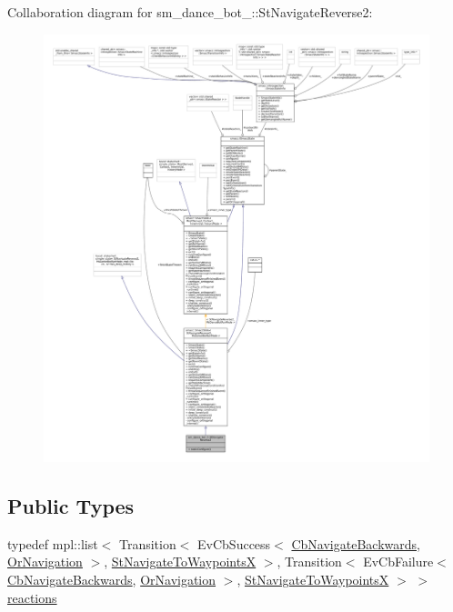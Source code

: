 Collaboration diagram for sm\+\_\+dance\+\_\+bot\+\_\+:\+:St\+Navigate\+Reverse2\+:
\nopagebreak
\begin{figure}[H]
\begin{center}
\leavevmode
\includegraphics[width=350pt]{structsm__dance__bot__2_1_1StNavigateReverse2__coll__graph}
\end{center}
\end{figure}
\subsection*{Public Types}
\begin{DoxyCompactItemize}
\item 
typedef mpl\+::list$<$ Transition$<$ Ev\+Cb\+Success$<$ \hyperlink{classcl__move__base__z_1_1CbNavigateBackwards}{Cb\+Navigate\+Backwards}, \hyperlink{classsm__dance__bot__2_1_1OrNavigation}{Or\+Navigation} $>$, \hyperlink{structsm__dance__bot__2_1_1StNavigateToWaypointsX}{St\+Navigate\+To\+WaypointsX} $>$, Transition$<$ Ev\+Cb\+Failure$<$ \hyperlink{classcl__move__base__z_1_1CbNavigateBackwards}{Cb\+Navigate\+Backwards}, \hyperlink{classsm__dance__bot__2_1_1OrNavigation}{Or\+Navigation} $>$, \hyperlink{structsm__dance__bot__2_1_1StNavigateToWaypointsX}{St\+Navigate\+To\+WaypointsX} $>$ $>$ \hyperlink{structsm__dance__bot__2_1_1StNavigateReverse2_afb84e7844ea33fac1d12ec7f243c8e65}{reactions}
\end{DoxyCompactItemize}
